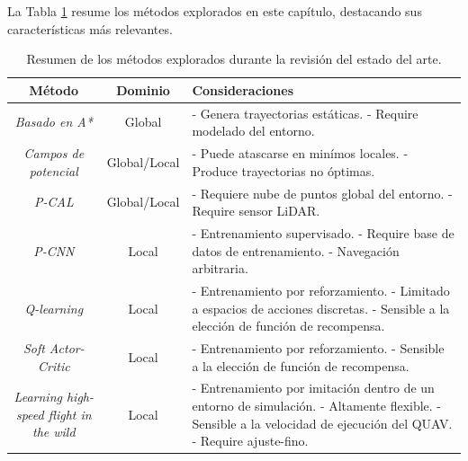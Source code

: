 La Tabla \ref{tab:prev-summary} resume los métodos explorados en este capítulo, destacando sus características más relevantes.

\begin{table}[H]
\scriptsize
\centering
\begin{tabular}{|c|c|p{60mm}|}
\hline

\textbf{Método} & \textbf{Dominio}\footnotemark & \textbf{Consideraciones}\\ \hline

\textit{Basado en A*} \cite{shi2018collision} & Global & 
    - Genera trayectorias estáticas. \newline
    - Require modelado del entorno.
\\ \hline

\textit{Campos de potencial} \cite{lifen2016path} & Global/Local & 
    - Puede atascarse en minímos locales. \newline
    - Produce trayectorias no óptimas.
\\ \hline

\textit{P-CAL} \cite{Zhang2019} & Global/Local & 
    - Requiere nube de puntos global del entorno. \newline
    - Require sensor LiDAR.
\\ \hline

\textit{P-CNN} \cite{Yang2021} & Local & 
    - Entrenamiento supervisado. \newline
    - Require base de datos de entrenamiento. \newline
    - Navegación arbitraria.
\\ \hline

\textit{Q-learning} \cite{Tu2023} & Local & 
    - Entrenamiento por reforzamiento. \newline
    - Limitado a espacios de acciones discretas. \newline
    - Sensible a la elección de función de recompensa. 
\\ \hline

\textit{Soft Actor-Critic} \cite{Xue2021} & Local & 
    - Entrenamiento por reforzamiento. \newline
    - Sensible a la elección de función de recompensa. 
\\ \hline

\textit{Learning high-speed flight in the wild} \cite{Loquercio2021} & Local & 
    - Entrenamiento por imitación dentro de un entorno de simulación. \newline
    - Altamente flexible. \newline
    - Sensible a la velocidad de ejecución del QUAV. \newline
    - Require ajuste-fino.
\\ \hline

\end{tabular}

\caption[Resumen de los métodos explorados durante la revisión del estado del arte.]{Resumen de los métodos explorados durante la revisión del estado del arte.}
\label{tab:prev-summary}
\end{table}

